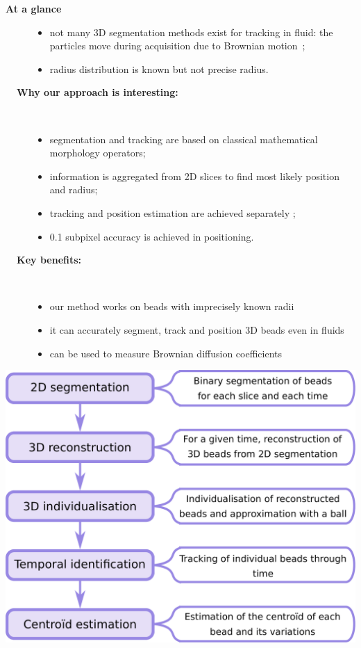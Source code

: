 \documentclass[final,svgnames,dvipsnames,table]{beamer}
\begin{document}
\begin{frame}[fragile]
\begin{exampleblock}{\bf At a glance}
\begin{multicols}{2}
\begin{description}
\begin{itemize}
      \item not many 3D segmentation methods exist for tracking in
        fluid: the particles move during acquisition due to Brownian
        motion~{\color{cyan}\cite{puybareau2017morphologicalposter}};
      \item radius distribution is known but not precise radius.
      \end{itemize} \bigskip %
    \item[{\bf ~~Why our approach is interesting:}] ~ %
      \begin{itemize}
      \item segmentation and tracking are based on classical mathematical morphology operators;
      \item information is aggregated from 2D slices to find most likely
        position and radius;
      \item tracking and position estimation are achieved separately ;
      \item 0.1 subpixel accuracy is achieved in positioning.
      \end{itemize} \bigskip %
    \item[{\bf ~~Key benefits:} ] ~ %
      \begin{itemize}
      \item our method works on beads with imprecisely known radii
      \item it can accurately segment, track and position 3D beads even
        in fluids
      \item can be used to measure Brownian diffusion coefficients
      \end{itemize}
    \end{description}
    \includegraphics[width = 0.6\linewidth]{images/flowchart.pdf}
    \end{multicols}
   \end{exampleblock}
   

\end{frame}
\end{document}
